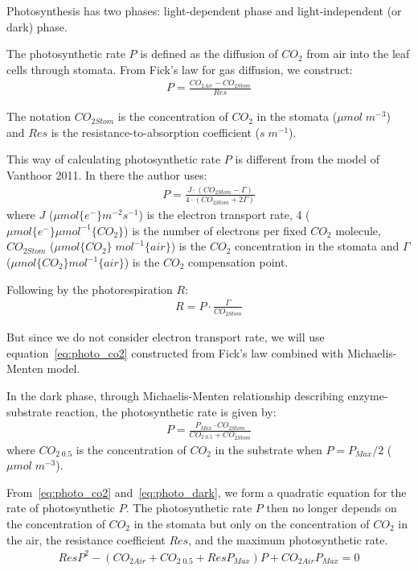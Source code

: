 \documentclass[a4paper]{article}
\begin{document}
Photosynthesis has two phases: light-dependent phase and light-independent (or dark) phase.

The photosynthetic rate \(P\) is defined as the diffusion of \(CO_2\) from air into the leaf cells through stomata. From Fick's law for gas diffusion, we construct:
\begin{align}
  \label{eq:photo_co2}
  P = \frac{CO_{2Air} - CO_{2Stom}}{Res}
\end{align}

The notation \(CO_{2Stom}\) is the concentration of \(CO_2\) in the stomata (\(\mu mol\;m^{-3}\)) and \(Res\) is the resistance-to-absorption coefficient (\(s\;m^{-1}\)).

This way of calculating photosynthetic rate \(P\) is different from the model of Vanthoor 2011. In there the author uses:
\begin{align}
  P = \frac{J \cdot (CO_{2Stom} - \Gamma)}{4 \cdot (CO_{2Stom} + 2\Gamma)}
\end{align}
where \(J\) (\(\mu mol \{e^-\} m^{-2} s^{-1}\)) is the electron transport rate, 4 (\(\mu mol \{e^-\} \mu mol^{-1} \{CO_2\}\)) is the
number of electrons per fixed \(CO_2\) molecule, \(CO_{2Stom}\) (\(\mu mol\{CO_2\}\;mol^{-1}\{air\}\)) is the \(CO_2\) concentration in the stomata and \(\Gamma\) (\(\mu mol \{CO_2\} mol^{-1} \{air\}\)) is the \(CO_2\) compensation point.

Following by the photorespiration \(R\):
\begin{align}
  R = P \cdot \frac{\Gamma}{CO_{2Stom}}
\end{align}

But since we do not consider electron transport rate, we will use equation~\eqref{eq:photo_co2} constructed from Fick's law combined with Michaelis-Menten model.

In the dark phase, through Michaelis-Menten relationship describing enzyme-substrate reaction, the photosynthetic rate is given by:
\begin{align}
  \label{eq:photo_dark}
  P = \frac{P_{Max} \cdot CO_{2Stom}}{CO_{2\;0.5} + CO_{2Stom}}
\end{align}
where \(CO_{2\;0.5}\) is the concentration of \(CO_2\) in the substrate when \(P = P_{Max}/2\) (\(\mu mol\;m^{-3}\)).

From~\eqref{eq:photo_co2} and~\eqref{eq:photo_dark}, we form a quadratic equation for the rate of photosynthetic \(P\). The photosynthetic rate \(P\) then no longer depends on the concentration of \(CO_2\) in the stomata but only on the concentration of \(CO_2\) in the air, the resistance coefficient \(Res\), and the maximum photosynthetic rate.
\begin{align}
  \label{eq:resist_photo}
  ResP^2 - (CO_{2Air} + CO_{2\;0.5} + ResP_{Max})P + CO_{2Air}P_{Max} = 0
\end{align}
\end{document}
